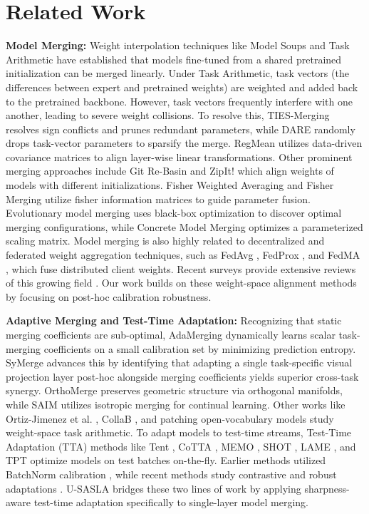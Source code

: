 \documentclass{article}
\theoremstyle{plain}
\theoremstyle{definition}
\theoremstyle{remark}
\begin{document}
\section{Related Work}
\label{related_work}

\textbf{Model Merging:} Weight interpolation techniques like Model Soups \cite{model_soups} and Task Arithmetic \cite{task_arithmetic} have established that models fine-tuned from a shared pretrained initialization can be merged linearly. Under Task Arithmetic, task vectors (the differences between expert and pretrained weights) are weighted and added back to the pretrained backbone. However, task vectors frequently interfere with one another, leading to severe weight collisions. To resolve this, TIES-Merging \cite{ties_merging} resolves sign conflicts and prunes redundant parameters, while DARE \cite{dare} randomly drops task-vector parameters to sparsify the merge. RegMean \cite{regmean} utilizes data-driven covariance matrices to align layer-wise linear transformations. Other prominent merging approaches include Git Re-Basin \cite{git_rebasin} and ZipIt! \cite{zipit} which align weights of models with different initializations. Fisher Weighted Averaging \cite{fisher_merging} and Fisher Merging \cite{elastic_merging} utilize fisher information matrices to guide parameter fusion. Evolutionary model merging \cite{evolutionary_merging} uses black-box optimization to discover optimal merging configurations, while Concrete Model Merging \cite{concrete_merging} optimizes a parameterized scaling matrix. Model merging is also highly related to decentralized and federated weight aggregation techniques, such as FedAvg \cite{fedavg}, FedProx \cite{fedprox}, and FedMA \cite{fedma}, which fuse distributed client weights. Recent surveys provide extensive reviews of this growing field \cite{survey_merging, llm_merging_survey}. Our work builds on these weight-space alignment methods by focusing on post-hoc calibration robustness.

\textbf{Adaptive Merging and Test-Time Adaptation:} Recognizing that static merging coefficients are sub-optimal, AdaMerging \cite{adamerging} dynamically learns scalar task-merging coefficients on a small calibration set by minimizing prediction entropy. SyMerge \cite{symerge} advances this by identifying that adapting a single task-specific visual projection layer post-hoc alongside merging coefficients yields superior cross-task synergy. OrthoMerge \cite{orthomerge} preserves geometric structure via orthogonal manifolds, while SAIM \cite{saim} utilizes isotropic merging for continual learning. Other works like Ortiz-Jimenez et al. \cite{tangent_arithmetic}, CollaB \cite{collab}, and patching open-vocabulary models \cite{patching} study weight-space task arithmetic.
To adapt models to test-time streams, Test-Time Adaptation (TTA) methods like Tent \cite{tent}, CoTTA \cite{cotta}, MEMO \cite{memo}, SHOT \cite{shot}, LAME \cite{lame}, and TPT \cite{tpt} optimize models on test batches on-the-fly. Earlier methods utilized BatchNorm calibration \cite{bn_adaptation}, while recent methods study contrastive and robust adaptations \cite{adacontrast, note, tta_adaptation, asla}. U-SASLA bridges these two lines of work by applying sharpness-aware test-time adaptation specifically to single-layer model merging.
\end{document}
